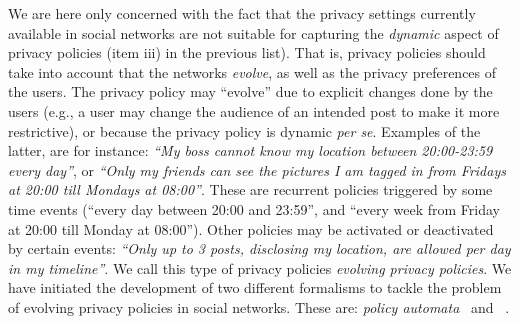 
We are here only concerned with the fact that the privacy settings currently available in social networks are not suitable for capturing the {\em dynamic} aspect of privacy policies (item iii) in the previous list). That is, privacy policies should take into account that the networks {\it evolve}, as well as the privacy preferences of the users. The privacy policy may ``evolve'' due to explicit changes done by the users (e.g., a user may change the audience of an intended post to make it more restrictive), or because the privacy policy is dynamic {\it per se}. Examples of the latter, are for instance: {\it ``My boss cannot know my location between 20:00-23:59 every day''}, or {\it ``Only my friends can see the pictures I am tagged in from Fridays at 20:00 till Mondays at 08:00''}. These are recurrent policies triggered by some time events (``every day between 20:00 and 23:59'', and ``every week from Friday at 20:00 till Monday at 08:00''). Other policies may be activated or deactivated by certain events: {\it ``Only up to 3 posts, disclosing my location, are allowed per day in my timeline''}. We call this type of privacy policies {\em evolving privacy policies}. We have initiated the development of two different formalisms to tackle the problem of evolving privacy policies in social networks. These are: {\em policy automata}~\cite{PCPS16aaeppsn} and \tfppf~\cite{PKSS16sepposn}.

